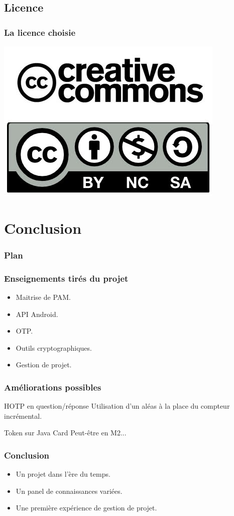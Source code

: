 \documentclass[xcolor=table]{beamer}
\begin{document}
\subsection{Licence}
\begin{frame}
\frametitle{La licence choisie}
\begin{center}
\includegraphics[scale=0.7]{../graphics/licence.jpg}
\end{center}


\end{frame}


\section{Conclusion}

\begin{frame}  
\frametitle{Plan} 
\end{frame}

\begin{frame}
\frametitle{Enseignements tirés du projet}
\begin{itemize}
\item Maitrise de PAM.
\item API Android.
\item OTP.
\item Outils cryptographiques.
\item Gestion de projet.
\end{itemize}
\end{frame}


\begin{frame}
\frametitle{Améliorations possibles}

\begin{block}{HOTP en question/réponse}
Utilisation d'un aléas à la place du compteur incrémental.
\end{block}

\begin{block}{Token sur Java Card}
Peut-être en M2...
\end{block}


\end{frame}

\begin{frame}
\frametitle{Conclusion}
\begin{itemize}
\item Un projet dans l'ère du temps.
\item Un panel de connaissances variées.
\item Une première expérience de gestion de projet.
\end{itemize}
\end{frame}
\end{document}
